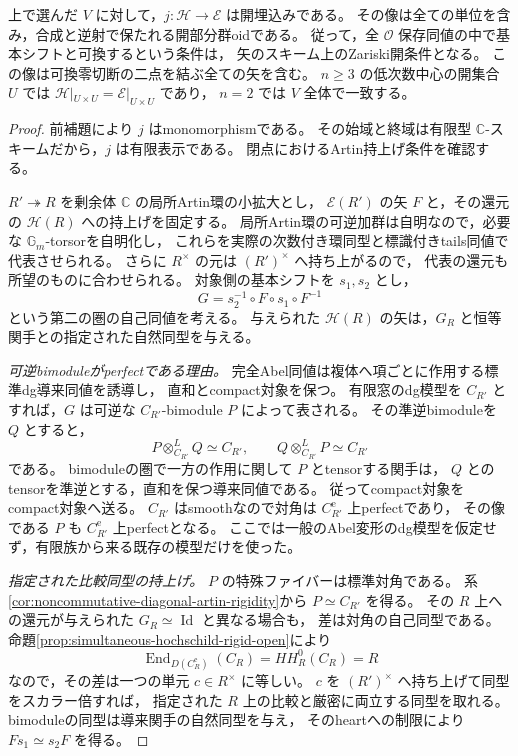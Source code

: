 \begin{theorem}[Hochschild剛性による基本シフト認識の開性]
\label{thm:ordinary-graded-arrows-open}
上で選んだ $V$ に対して，$j:\mathcal H\to\mathcal E$ は開埋込みである。
その像は全ての単位を含み，合成と逆射で保たれる開部分群oidである。
従って，全 $\mathcal O$ 保存同値の中で基本シフトと可換するという条件は，
矢のスキーム上のZariski開条件となる。
この像は可換零切断の二点を結ぶ全ての矢を含む。
$n\ge3$ の低次数中心の開集合 $U$ では
$\mathcal H|_{U\times U}=\mathcal E|_{U\times U}$ であり，
$n=2$ では $V$ 全体で一致する。
\end{theorem}
\begin{proof}
前補題により $j$ はmonomorphismである。
その始域と終域は有限型 $\mathbb C$-スキームだから，$j$ は有限表示である。
閉点におけるArtin持上げ条件を確認する。

$R'\twoheadrightarrow R$ を剰余体 $\mathbb C$ の局所Artin環の小拡大とし，
$\mathcal E(R')$ の矢 $F$ と，その還元の $\mathcal H(R)$ への持上げを固定する。
局所Artin環の可逆加群は自明なので，必要な $\mathbb G_m$-torsorを自明化し，
これらを実際の次数付き環同型と標識付きtails同値で代表させられる。
さらに $R^\times$ の元は $(R')^\times$ へ持ち上がるので，
代表の還元も所望のものに合わせられる。
対象側の基本シフトを $s_1,s_2$ とし，
\[
 G=s_2^{-1}\circ F\circ s_1\circ F^{-1}
\]
という第二の圏の自己同値を考える。
与えられた $\mathcal H(R)$ の矢は，$G_R$ と恒等関手との指定された自然同型を与える。

\emph{可逆bimoduleがperfectである理由。}
完全Abel同値は複体へ項ごとに作用する標準dg導来同値を誘導し，
直和とcompact対象を保つ。
有限窓のdg模型を $C_{R'}$ とすれば，$G$ は可逆な
$C_{R'}$-bimodule $P$ によって表される。
その準逆bimoduleを $Q$ とすると，
\[
 P\otimes^L_{C_{R'}}Q\simeq C_{R'},
 \qquad Q\otimes^L_{C_{R'}}P\simeq C_{R'}
\]
である。
bimoduleの圏で一方の作用に関して $P$ とtensorする関手は，
$Q$ とのtensorを準逆とする，直和を保つ導来同値である。
従ってcompact対象をcompact対象へ送る。
$C_{R'}$ はsmoothなので対角は $C_{R'}^{\mathrm e}$ 上perfectであり，
その像である $P$ も $C_{R'}^{\mathrm e}$ 上perfectとなる。
ここでは一般のAbel変形のdg模型を仮定せず，有限族から来る既存の模型だけを使った。

\emph{指定された比較同型の持上げ。}
$P$ の特殊ファイバーは標準対角である。
系\ref{cor:noncommutative-diagonal-artin-rigidity}から
$P\simeq C_{R'}$ を得る。
その $R$ 上への還元が与えられた $G_R\simeq\operatorname{Id}$ と異なる場合も，
差は対角の自己同型である。
命題\ref{prop:simultaneous-hochschild-rigid-open}により
\[
 \operatorname{End}_{D(C_R^{\mathrm e})}(C_R)=HH_R^0(C_R)=R
\]
なので，その差は一つの単元 $c\in R^\times$ に等しい。
$c$ を $(R')^\times$ へ持ち上げて同型をスカラー倍すれば，
指定された $R$ 上の比較と厳密に両立する同型を取れる。
bimoduleの同型は導来関手の自然同型を与え，
そのheartへの制限により $Fs_1\simeq s_2F$ を得る。


\end{proof}
